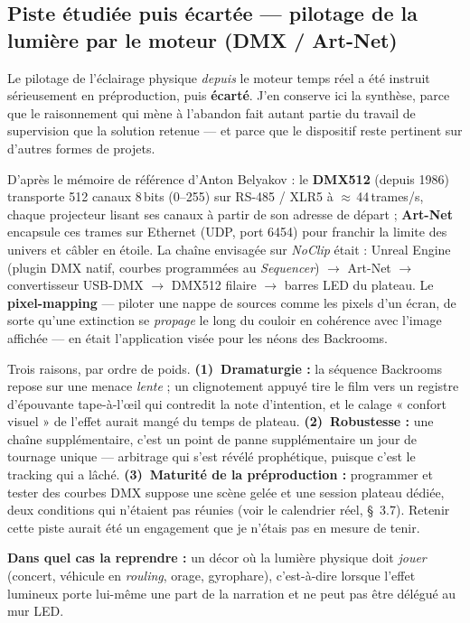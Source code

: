 \documentclass[11pt,a4paper]{report}
\begin{document}
\subsection{Piste étudiée puis écartée --- pilotage de la lumière par le moteur (DMX / Art-Net)}
\label{sec:dmx_artnet}
Le pilotage de l'éclairage physique \emph{depuis} le moteur temps réel a été instruit sérieusement
en préproduction, puis \textbf{écarté}. J'en conserve ici la synthèse, parce que le raisonnement qui
mène à l'abandon fait autant partie du travail de supervision que la solution retenue --- et parce
que le dispositif reste pertinent sur d'autres formes de projets.

\begin{notebox}[title={Ce qu'il aurait fallu mettre en place}]
\footnotesize
D'après le mémoire de référence d'Anton Belyakov \autocite{belyakov2023} : le \textbf{DMX512}
(depuis 1986) transporte 512 canaux 8\,bits (0--255) sur RS-485 / XLR5 à $\approx$\,44\,trames/s,
chaque projecteur lisant ses canaux à partir de son adresse de départ ; \textbf{Art-Net} encapsule
ces trames sur Ethernet (UDP, port 6454) pour franchir la limite des univers et câbler en étoile.
La chaîne envisagée sur \textit{NoClip} était : Unreal Engine (plugin DMX natif, courbes
programmées au \emph{Sequencer}) $\rightarrow$ Art-Net $\rightarrow$ convertisseur USB-DMX
$\rightarrow$ DMX512 filaire $\rightarrow$ barres LED du plateau. Le \textbf{pixel-mapping} ---
piloter une nappe de sources comme les pixels d'un écran, de sorte qu'une extinction se
\emph{propage} le long du couloir en cohérence avec l'image affichée --- en était l'application
visée pour les néons des Backrooms.
\end{notebox}

\begin{infobox}[title={Pourquoi cette piste a été abandonnée}]
Trois raisons, par ordre de poids. \textbf{(1)~Dramaturgie :} la séquence Backrooms repose sur
une menace \emph{lente} ; un clignotement appuyé tire le film vers un registre d'épouvante
tape-à-l'\oe il qui contredit la note d'intention, et le calage « confort visuel » de l'effet aurait
mangé du temps de plateau. \textbf{(2)~Robustesse :} une chaîne supplémentaire, c'est un point
de panne supplémentaire un jour de tournage unique --- arbitrage qui s'est révélé prophétique,
puisque c'est le tracking qui a lâché. \textbf{(3)~Maturité de la préproduction :} programmer et
tester des courbes DMX suppose une scène gelée et une session plateau dédiée, deux conditions
qui n'étaient pas réunies (voir le calendrier réel, §~3.7). Retenir cette piste aurait été un
engagement que je n'étais pas en mesure de tenir.

\medskip
\textbf{Dans quel cas la reprendre :} un décor où la lumière physique doit \emph{jouer} (concert,
véhicule en \emph{rouling}, orage, gyrophare), c'est-à-dire lorsque l'effet lumineux porte lui-même
une part de la narration et ne peut pas être délégué au mur LED.
\end{infobox}
\end{document}
